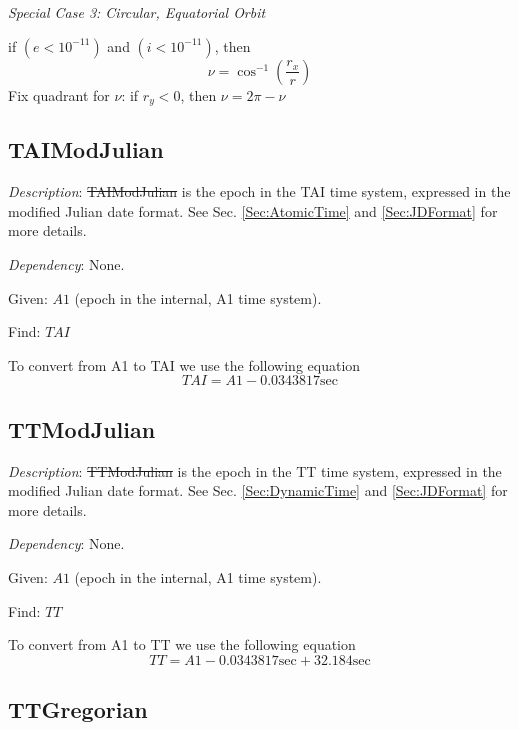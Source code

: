 \noindent\textit{Special Case 3:  Circular, Equatorial Orbit  }

\noindent if $(e < 10^{-11})$  and $(i < 10^{-11})$, then
%
\begin{equation}
    \nu = \cos^{-1}\left( \frac{r_x}{r}\right)
\end{equation}
%
Fix quadrant for $\nu$:  if $r_y < 0$, then $\nu = 2\pi - \nu$
%

\subsection{TAIModJulian}\label{Sec:TAIModJulian}

\noindent \textit{Description}: \st{TAIModJulian} is the epoch in
the TAI time system, expressed in the modified Julian date format.
See Sec. \ref{Sec:AtomicTime} and \ref{Sec:JDFormat} for more
details.

\noindent \textit{Dependency}:  None.

\noindent Given:  $A1$ (epoch in the internal, A1 time system).

\noindent Find:  $TAI$

To convert from A1 to TAI we use the following equation
%
\begin{equation}
     TAI = A1 - 0.0343817 \mbox{sec}
\end{equation}

\subsection{TTModJulian}\label{Sec:TTModJulian}

\noindent \textit{Description}: \st{TTModJulian} is the epoch in
the TT time system, expressed in the modified Julian date format.
See Sec. \ref{Sec:DynamicTime} and \ref{Sec:JDFormat} for more
details.

\noindent \textit{Dependency}:  None.

\noindent Given:  $A1$ (epoch in the internal, A1 time system).

\noindent Find:  $TT$

To convert from A1 to TT we use the following equation
%
\begin{equation}
     TT = A1 - 0.0343817 \mbox{sec} + 32.184 \mbox{sec}
     \label{Eq:TTModJulian}
\end{equation}

\subsection{TTGregorian}\label{Sec:TTGregorian}

